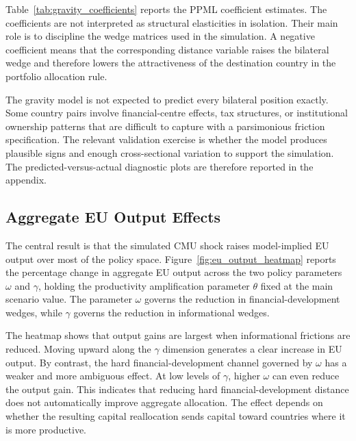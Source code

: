 Table~\ref{tab:gravity_coefficients} reports the PPML coefficient estimates. The coefficients are not interpreted as structural elasticities in isolation. Their main role is to discipline the wedge matrices used in the simulation. A negative coefficient means that the corresponding distance variable raises the bilateral wedge and therefore lowers the attractiveness of the destination country in the portfolio allocation rule.

\begin{table}[H]
    \centering
    \caption{Gravity model estimates}
    \label{tab:gravity_coefficients}
\end{table}

The gravity model is not expected to predict every bilateral position exactly. Some country pairs involve financial-centre effects, tax structures, or institutional ownership patterns that are difficult to capture with a parsimonious friction specification. The relevant validation exercise is whether the model produces plausible signs and enough cross-sectional variation to support the simulation. The predicted-versus-actual diagnostic plots are therefore reported in the appendix.

\subsection{Aggregate EU Output Effects}
\label{sec:results_aggregate_output}

The central result is that the simulated CMU shock raises model-implied EU output over most of the policy space. Figure~\ref{fig:eu_output_heatmap} reports the percentage change in aggregate EU output across the two policy parameters $\omega$ and $\gamma$, holding the productivity amplification parameter $\theta$ fixed at the main scenario value. The parameter $\omega$ governs the reduction in financial-development wedges, while $\gamma$ governs the reduction in informational wedges.

The heatmap shows that output gains are largest when informational frictions are reduced. Moving upward along the $\gamma$ dimension generates a clear increase in EU output. By contrast, the hard financial-development channel governed by $\omega$ has a weaker and more ambiguous effect. At low levels of $\gamma$, higher $\omega$ can even reduce the output gain. This indicates that reducing hard financial-development distance does not automatically improve aggregate allocation. The effect depends on whether the resulting capital reallocation sends capital toward countries where it is more productive.

